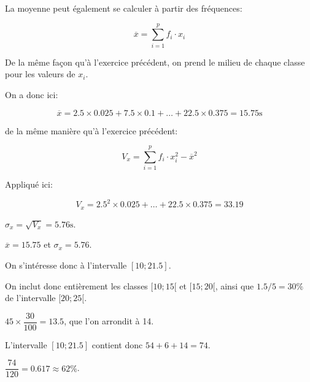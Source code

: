 \documentclass[a4paper,12pt]{scrartcl}
\begin{document}
\question{}
La moyenne peut également se calculer à partir des fréquences: 

$$\overline{x} = \sum_{i=1}^{p} f_i \cdot x_i$$

De la même façon qu'à l'exercice précédent, on prend le milieu de chaque classe pour les valeurs de $x_i$.

On a donc ici:

$$\overline{x} = 2.5 \times 0.025 + 7.5 \times 0.1 + \ldots + 22.5 \times 0.375 = 15.75 \mbox{s}$$


de la même manière qu'à l'exercice précédent:

$$V_x = \sum_{i=1}^{p} f_i \cdot x_i^2 - \overline{x}^2$$

Appliqué ici: 

$$V_x = 2.5^2 \times 0.025 + \ldots + 22.5 \times 0.375 = 33.19$$


$\sigma_x = \sqrt{V_x} = 5.76 \mbox{s}$.

\question{}
$\overline{x} = 15.75$ et $\sigma_x = 5.76$.

On s'intéresse donc à l'intervalle $[10;21.5]$.

On inclut donc entièrement les classes $[10;15[$ et $[15;20[$, ainsi que $1.5/5 = 30\%$ de l'intervalle $[20;25[$.

$45 \times \dfrac{30}{100} = 13.5$, que l'on arrondit à 14. 

L'intervalle $[10;21.5]$ contient donc $54+6+14 = 74$.

$\dfrac{74}{120} = 0.617 \approx 62\%$.

\trait
\end{document}
